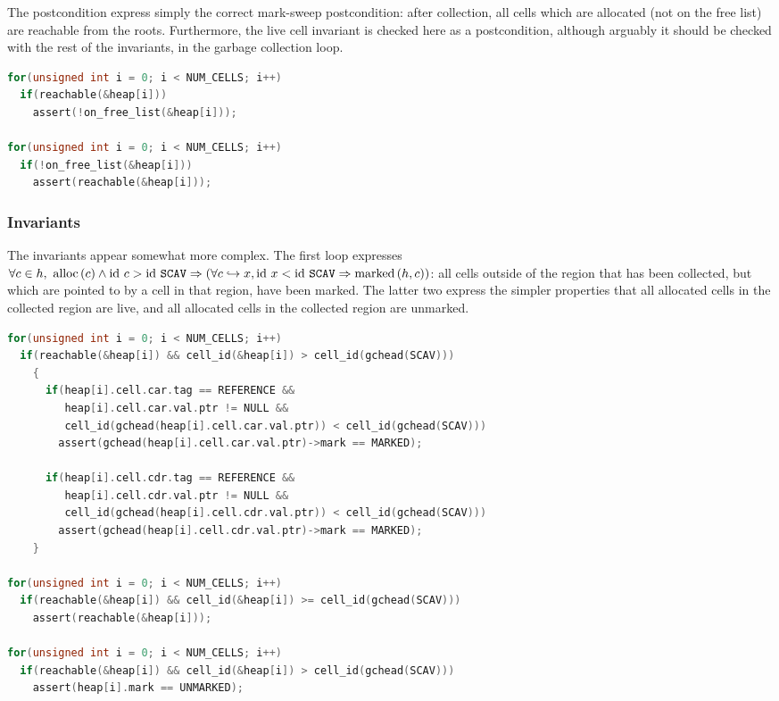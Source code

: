 The postcondition express simply the correct mark-sweep postcondition:
after collection, all cells which are allocated (not on the free list)
are reachable from the roots. Furthermore, the live cell invariant is
checked here as a postcondition, although arguably it should be
checked with the rest of the invariants, in the garbage collection
loop.

\begin{lstlisting}[language=C,caption={Armstrong/Virding Postconditions}]
for(unsigned int i = 0; i < NUM_CELLS; i++)
  if(reachable(&heap[i]))
    assert(!on_free_list(&heap[i]));

for(unsigned int i = 0; i < NUM_CELLS; i++)
  if(!on_free_list(&heap[i]))
    assert(reachable(&heap[i]));
\end{lstlisting}

\subsubsection{Invariants}
\label{sec:results-impl-ms-invariants}

The invariants appear somewhat more complex. The first loop expresses
$\forall c \in h,\ \mathrm{alloc}\left(c\right) \land \mathrm{id}~c > \mathrm{id}~\mathtt{SCAV} \Rightarrow
(\forall c \hookrightarrow x, \mathrm{id}~x < \mathrm{id}~\mathtt{SCAV} \Rightarrow
\mathrm{marked}\left(h, c\right))$: all cells outside of the region that has been
collected, but which are pointed to by a cell in that region, have
been marked. The latter two express the simpler properties that all
allocated cells in the collected region are live, and all allocated
cells in the collected region are unmarked.

\begin{lstlisting}[language=C,caption={Armstrong/Virding Invariants}]
for(unsigned int i = 0; i < NUM_CELLS; i++)
  if(reachable(&heap[i]) && cell_id(&heap[i]) > cell_id(gchead(SCAV)))
    {
      if(heap[i].cell.car.tag == REFERENCE &&
         heap[i].cell.car.val.ptr != NULL &&
         cell_id(gchead(heap[i].cell.car.val.ptr)) < cell_id(gchead(SCAV)))
        assert(gchead(heap[i].cell.car.val.ptr)->mark == MARKED);

      if(heap[i].cell.cdr.tag == REFERENCE &&
         heap[i].cell.cdr.val.ptr != NULL &&
         cell_id(gchead(heap[i].cell.cdr.val.ptr)) < cell_id(gchead(SCAV)))
        assert(gchead(heap[i].cell.cdr.val.ptr)->mark == MARKED);
    }

for(unsigned int i = 0; i < NUM_CELLS; i++)
  if(reachable(&heap[i]) && cell_id(&heap[i]) >= cell_id(gchead(SCAV)))
    assert(reachable(&heap[i]));

for(unsigned int i = 0; i < NUM_CELLS; i++)
  if(reachable(&heap[i]) && cell_id(&heap[i]) > cell_id(gchead(SCAV)))
    assert(heap[i].mark == UNMARKED);
\end{lstlisting}

